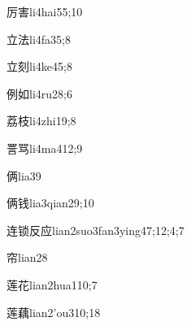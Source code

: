 \begin{verbete}{厉害}{li4hai5}{5;10}
\end{verbete}

\begin{verbete}{立法}{li4fa3}{5;8}
\end{verbete}

\begin{verbete}{立刻}{li4ke4}{5;8}
\end{verbete}

\begin{verbete}{例如}{li4ru2}{8;6}
\end{verbete}

\begin{verbete}{荔枝}{li4zhi1}{9;8}
\end{verbete}

\begin{verbete}{詈骂}{li4ma4}{12;9}
\end{verbete}

\begin{verbete}{俩}{lia3}{9}
\end{verbete}

\begin{verbete}{俩钱}{lia3qian2}{9;10}
\end{verbete}

\begin{verbete}{连锁反应}{lian2suo3fan3ying4}{7;12;4;7}
\end{verbete}

\begin{verbete}{帘}{lian2}{8}
\end{verbete}

\begin{verbete}{莲花}{lian2hua1}{10;7}
\end{verbete}

\begin{verbete}{莲藕}{lian2'ou3}{10;18}
\end{verbete}

